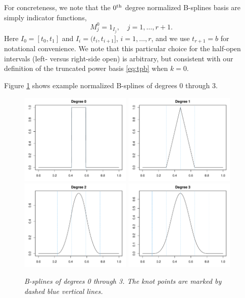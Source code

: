 \documentclass{article}
\begin{document}
For concreteness, we note that the $0^{\text{th}}$ degree normalized B-splines basis are
simply indicator functions,
\[
M^0_j = 1_{I_j}, \quad j=1,\dots,r+1.
\]
Here $I_0=[t_0,t_1]$ and $I_i=(t_i,t_{i+1}]$, $i=1,\dots,r$, and we use
$t_{r+1}=b$ for notational convenience. We note that this particular choice for
the half-open intervals (left- versus right-side open) is arbitrary, but
consistent with our definition of the truncated power basis \eqref{eq:tpb}
when $k=0$. 

Figure \ref{fig:bs} shows example normalized B-splines of degrees 0 through 3.    

\begin{figure}[tb]
\centering
\includegraphics[width=0.475\textwidth]{bs0.pdf} 
\includegraphics[width=0.475\textwidth]{bs1.pdf} 
\includegraphics[width=0.475\textwidth]{bs2.pdf} 
\includegraphics[width=0.475\textwidth]{bs3.pdf} 
\caption{\it B-splines of degrees 0 through 3. The knot points are marked by
  dashed blue vertical lines.}
\label{fig:bs}
\end{figure}
\end{document}
